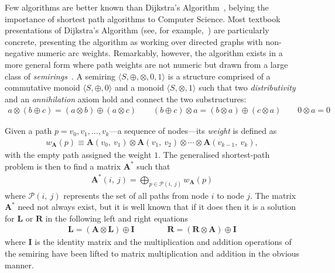 Few algorithms are better known than Dijkstra's Algorithm~\cite{dijkstra:note:1959}, belying the importance of shortest path algorithms to Computer Science.
Most textbook presentations of Dijkstra's Algorithm (see, for example,~\cite[Chapter 24]{clrs}) are particularly concrete, presenting the algorithm as working over directed graphs with non-negative numeric arc weights.
Remarkably, however, the algorithm exists in a more general form where path weights are not numeric but drawn from a large class of \emph{semirings}~\cite{gondran_graphs_2008, mohri:semiring:2002}.
A semiring $\langle S, \oplus, \otimes, 0, 1 \rangle$ is a structure comprised of a commutative monoid $\langle S, \oplus, 0\rangle$ and a monoid $\langle S, \otimes, 1\rangle$ such that two \emph{distributivity} and an \emph{annihilation} axiom hold and connect the two substructures:
\begin{gather*}
a\otimes (b \oplus c) = (a\otimes b) \oplus (a\otimes c) \qquad
(b \oplus c) \otimes a = (b\otimes a) \oplus (c\otimes a) \qquad
0 \otimes a = 0
\end{gather*}

Given a path $p = v_0, v_1, \ldots, v_k$---a sequence of nodes---its \emph{weight} is defined as
\begin{gather*}
    w_{\mathbf{A}}(p)
    \equiv
    \mathbf{A}(v_0,\ v_1)
    \otimes \mathbf{A}(v_1,\ v_2)
    \otimes \cdots
    \otimes \mathbf{A}(v_{k-1},\ v_k),
\end{gather*}
with the empty path assigned the weight $1$.
The generalised shortest-path problem is then to find a matrix $\mathbf{A}^*$ such that
\begin{gather*}
\label{eq:global}
\mathbf{A}^*(i,\ j) = \displaystyle\bigoplus_{p \in \mathcal{P}(i,\ j)} w_{\mathbf{A}}(p)
\end{gather*}
where $\mathcal{P}(i,\ j)$ represents the set of all paths from node $i$ to node $j$.
The matrix $\mathbf{A}^*$ need not always exist, but it is well known that if it does then it is a solution for $\mathbf{L}$ or $\mathbf{R}$ in the following left and right equations
\begin{gather*}
\mathbf{L} = (\mathbf{A} \otimes \mathbf{L}) \oplus \mathbf{I} \qquad\qquad
\mathbf{R} = (\mathbf{R} \otimes \mathbf{A}) \oplus \mathbf{I}
\end{gather*}
where $\mathbf{I}$ is the identity matrix and the multiplication and addition operations of the semiring have been lifted to matrix multiplication and addition in the obvious manner.

